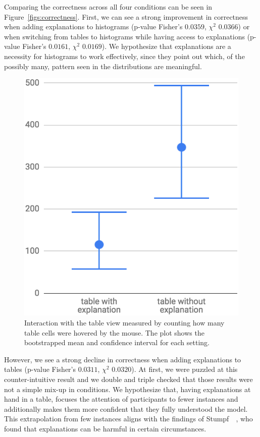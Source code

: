 Comparing the correctness across all four conditions can be seen in Figure~\ref{figs:correctness}.
First, we can see a strong improvement in correctness when adding explanations to histograms (p-value Fisher's $0.0359$, $\chi^2$ $0.0366$) or when switching from tables to histograms while having access to explanations (p-value Fisher's $0.0161$, $\chi^2$ $0.0169$).
We hypothesize that explanations are a necessity for histograms to work effectively, since they point out which, of the possibly many, pattern seen in the distributions are meaningful.

\begin{figure}[b]
\centering
\includegraphics[width=0.4\linewidth]{aggexplain/table_interaction}
\caption{
Interaction with the table view measured by counting how many table cells were hovered by the mouse.
The plot shows the bootstrapped mean and confidence interval for each setting.
}
\label{figs:table_interaction}
\end{figure}

However, we see a strong decline in correctness when adding explanations to tables (p-value Fisher's $0.0311$, $\chi^2$ $0.0320$).
At first, we were puzzled at this counter-intuitive result and we double and triple checked that those results were not a simple mix-up in conditions.
We hypothesize that, having explanations at hand in a table, focuses the attention of participants to fewer instances and additionally makes them more confident that they fully understood the model.
This extrapolation from few instances aligns with the findings of Stumpf~\etal~\cite{harmful}, who found that explanations can be harmful in certain circumstances.

